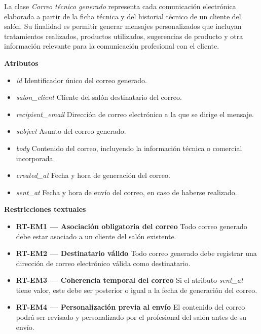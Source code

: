 La clase \textit{Correo técnico generado} representa cada comunicación electrónica elaborada a partir de la ficha técnica y del historial técnico de un cliente del salón. Su finalidad es permitir generar mensajes personalizados que incluyan tratamientos realizados, productos utilizados, sugerencias de producto y otra información relevante para la comunicación profesional con el cliente.

\textbf{Atributos}

\begin{itemize}

      \item \textit{id}
            Identificador único del correo generado.
      \item \textit{salon\_client}
            Cliente del salón destinatario del correo.
      \item \textit{recipient\_email}
            Dirección de correo electrónico a la que se dirige el mensaje.
      \item \textit{subject}
            Asunto del correo generado.
      \item \textit{body}
            Contenido del correo, incluyendo la información técnica o comercial incorporada.
      \item \textit{created\_at}
            Fecha y hora de generación del correo.
      \item \textit{sent\_at}
            Fecha y hora de envío del correo, en caso de haberse realizado.

\end{itemize}

\textbf{Restricciones textuales}

\begin{itemize}

      \item \textbf{RT-EM1 — Asociación obligatoria del correo}
            Todo correo generado debe estar asociado a un cliente del salón existente.
      \item \textbf{RT-EM2 — Destinatario válido}
            Todo correo generado debe registrar una dirección de correo electrónico válida como destinatario.
      \item \textbf{RT-EM3 — Coherencia temporal del correo}
            Si el atributo \textit{sent\_at} tiene valor, este debe ser posterior o igual a la fecha de generación del correo.
      \item \textbf{RT-EM4 — Personalización previa al envío}
            El contenido del correo podrá ser revisado y personalizado por el profesional del salón antes de su envío.
\end{itemize}

